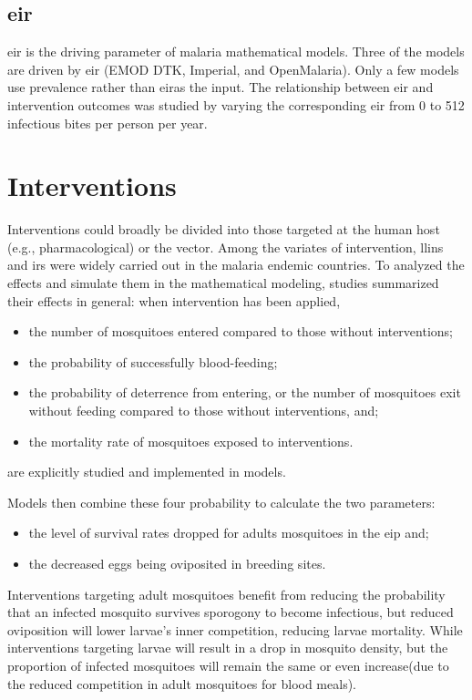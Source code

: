\documentclass[a4paper, 12pt, twoside]{report}
\begin{document}
\subsection{\texorpdfstring{\gls{eir}}{EIR}}%
\label{sub:eir}
\gls{eir} is the driving parameter of malaria mathematical models.
Three of the models are driven by \gls{eir} (EMOD DTK, Imperial, and OpenMalaria).
Only a few models use prevalence rather than \gls{eir}as the input.
The relationship between \gls{eir} and intervention outcomes was studied by varying the corresponding \gls{eir} from 0 to 512 infectious bites per person per year.

\section{Interventions}
Interventions could broadly be divided into those targeted at the human host (e.g., pharmacological) or the vector.
Among the variates of intervention, \gls{llins} and \gls{irs} were widely carried out in the malaria endemic countries. 
To analyzed the effects and simulate them in the mathematical modeling, studies summarized their effects in general: when intervention has been applied,

\begin{itemize}
	\item the number of mosquitoes entered compared to those without interventions;
  \item the probability of successfully blood-feeding;
	\item the probability of deterrence from entering, or the number of mosquitoes exit without feeding compared to those without interventions, and;
	\item the mortality rate of mosquitoes exposed to interventions.
\end{itemize}

are explicitly studied and implemented in models.

Models then combine these four probability to calculate the two parameters: 
\begin{itemize}
	\item the level of survival rates dropped for adults mosquitoes in the \gls{eip} and;
	\item the decreased eggs being oviposited in breeding sites.
\end{itemize}

Interventions targeting adult mosquitoes benefit from reducing the probability that an infected mosquito survives sporogony to become infectious, but reduced oviposition will lower larvae's inner competition, reducing larvae mortality.
While interventions targeting larvae will result in a drop in mosquito density, but the proportion of infected mosquitoes will remain the same or even increase(due to the reduced competition in adult mosquitoes for blood meals).
\end{document}
